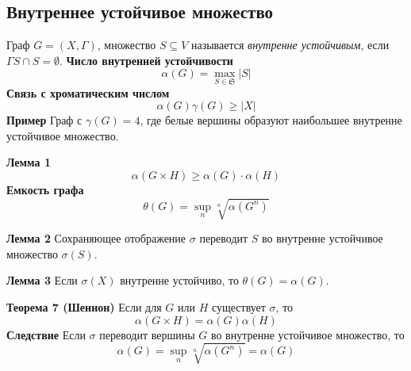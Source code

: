 \subsection{Внутреннее устойчивое множество}
Граф $G = (X, \Gamma)$, множество $S \subseteq V$ называется \textit{внутренне устойчивым}, если $\Gamma S \cap S = \emptyset$.
\textbf{Число внутренней устойчивости}
\[
\alpha(G) = \max_{S \in \mathfrak{S}} |S|
\]
\textbf{Связь с хроматическим числом}
\[
\alpha(G) \gamma(G) \geq |X|
\]
\textbf{Пример}
Граф с $\gamma(G) = 4$, где белые вершины образуют наибольшее внутренне устойчивое множество.

\textbf{Лемма 1}
\[
\alpha(G \times H) \geq \alpha(G) \cdot \alpha(H)
\]
\textbf{Емкость графа}
\[
\theta(G) = \sup_{n} \sqrt[n]{\alpha(G^n)}
\]

\textbf{Лемма 2}
Сохраняющее отображение $\sigma$ переводит $S$ во внутренне устойчивое множество $\sigma(S)$.

\textbf{Лемма 3}
Если $\sigma(X)$ внутренне устойчиво, то $\theta(G) = \alpha(G)$.

\textbf{Теорема 7 (Шеннон)}
Если для $G$ или $H$ существует $\sigma$, то
\[
\alpha(G \times H) = \alpha(G)\alpha(H)
\]
\textbf{Следствие}
Если $\sigma$ переводит вершины $G$ во внутренне устойчивое множество, то
\[
\alpha(G) = \sup_n \sqrt[n]{\alpha(G^n)} = \alpha(G)
\]